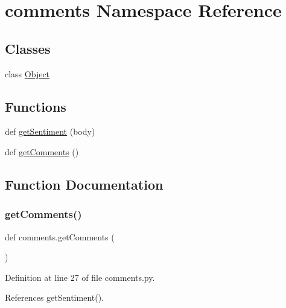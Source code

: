 \hypertarget{namespacecomments}{}\section{comments Namespace Reference}
\label{namespacecomments}
\subsection*{Classes}
\begin{DoxyCompactItemize}
\item 
class \hyperlink{classcomments_1_1_object}{Object}
\end{DoxyCompactItemize}
\subsection*{Functions}
\begin{DoxyCompactItemize}
\item 
def \hyperlink{namespacecomments_a15146b34dd7b539d081e27278c3c322e}{get\+Sentiment} (body)
\item 
def \hyperlink{namespacecomments_aadd79f53e655498635ea6597a88b219c}{get\+Comments} ()
\end{DoxyCompactItemize}


\subsection{Function Documentation}
\mbox{\label{namespacecomments_aadd79f53e655498635ea6597a88b219c}} 
\subsubsection{\texorpdfstring{get\+Comments()}{getComments()}}
{\footnotesize\ttfamily def comments.\+get\+Comments (\begin{DoxyParamCaption}{ }\end{DoxyParamCaption})}



Definition at line 27 of file comments.\+py.



References get\+Sentiment().


